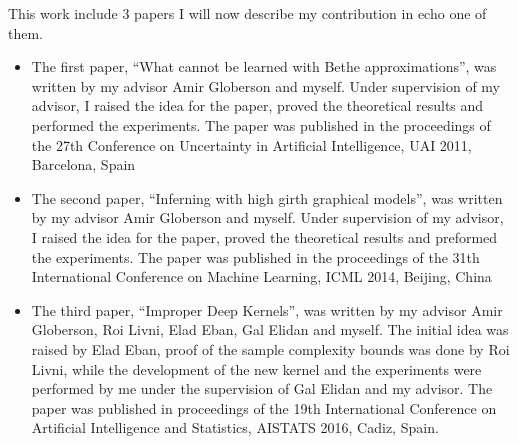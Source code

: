 This work include 3 papers I will now describe my contribution in echo one of them.
\begin{itemize}
\item
  The first paper, ``What cannot be learned with Bethe approximations'', was written by my advisor Amir Globerson and myself.
  Under supervision of my advisor, I raised the idea for the paper, proved the theoretical results and performed the experiments.
  The paper was published in the proceedings of the 27th Conference on Uncertainty in Artificial Intelligence, UAI 2011, Barcelona, Spain
\item
  The second paper, ``Inferning with high girth graphical models'', was written by my advisor Amir Globerson and myself.
  Under supervision of my advisor, I raised the idea for the paper, proved the theoretical results and preformed the experiments.
  The paper was published in the proceedings of the 31th International Conference on Machine Learning, ICML 2014, Beijing, China
\item
  The third paper, ``Improper Deep Kernels'', was written by my advisor Amir Globerson, Roi Livni, Elad Eban, Gal Elidan and myself.
  The initial idea was raised by Elad Eban, proof of the sample complexity bounds was done by Roi Livni, while the development of the new kernel and the experiments were performed by me under the supervision of Gal Elidan and my advisor.
  The paper was published in proceedings of the 19th International Conference on Artificial Intelligence and Statistics, AISTATS 2016, Cadiz, Spain.
\end{itemize}
